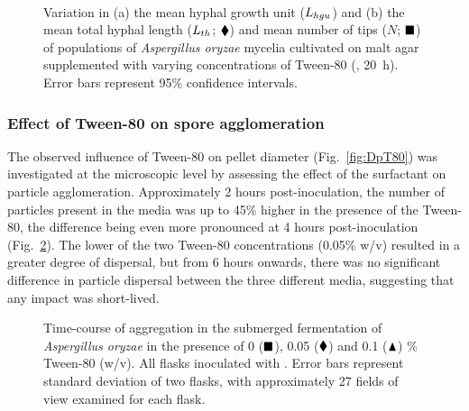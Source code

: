 \begin{figure}[htbp]
	\captionsetup[subfloat]{position=top}
	\centering
	\\
	\caption{Variation in (a) the mean hyphal growth unit ($L_{hgu}$) and (b) the mean total hyphal length ($L_{th}$; $\blacklozenge$) and mean number of tips ($N$; $\blacksquare$) of populations of \emph{Aspergillus oryzae} mycelia cultivated on malt agar supplemented with varying concentrations of Tween-80 (, 20~h). Error bars represent 95\% confidence intervals.}
	\label{fig:MicroT80}
\end{figure}

\subsubsection{Effect of Tween-80 on spore agglomeration}

The observed influence of Tween-80 on pellet diameter (Fig.~\ref{fig:DpT80}) was investigated at the microscopic level by assessing the effect of the surfactant on particle agglomeration. Approximately 2 hours post-inoculation, the number of particles present in the media was up to 45\% higher in the presence of the Tween-80, the difference being even more pronounced at 4 hours post-inoculation (Fig.~\ref{fig:AggT}). The lower of the two Tween-80 concentrations (0.05\% w/v) resulted in a greater degree of dispersal, but from 6 hours onwards, there was no significant difference in particle dispersal between the three different media, suggesting that any impact was short-lived.

\begin{figure}[tb]
	\centering
	\caption{Time-course of aggregation in the submerged fermentation of \emph{Aspergillus oryzae} in the presence of 0 ($\blacksquare$),  0.05 ($\blacklozenge$) and 0.1 ($\blacktriangle$) \% Tween-80 (w/v). All flasks inoculated with . Error bars represent standard deviation of two flasks, with approximately 27 fields of view examined for each flask.}
	\label{fig:AggT}
\end{figure}

